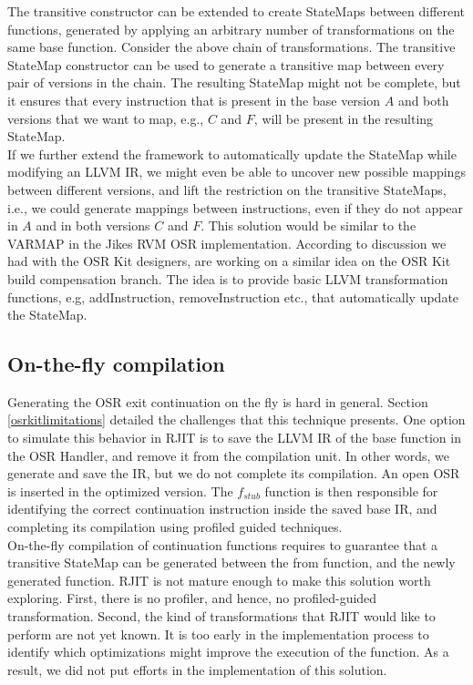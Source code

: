 The transitive constructor can be extended to create StateMaps between different functions, generated by applying an arbitrary number of transformations on the same base function.
Consider the above chain of transformations.
The transitive StateMap constructor can be used to generate a transitive map between every pair of versions in the chain.
The resulting StateMap might not be complete, but it ensures that every instruction that is present in the base version $A$ and both versions that we want to map, e.g., $C$ and $F$, will be present in the resulting StateMap.\\

If we further extend the framework to automatically update the StateMap while modifying an LLVM IR, we might even be able to uncover new possible mappings between different versions, and lift the restriction on the transitive StateMaps, i.e., we could generate mappings between instructions, even if they do not appear in $A$ and in both versions $C$ and $F$.
This solution would be similar to the VARMAP in the Jikes RVM OSR implementation\cite{soman2006efficient}.
According to discussion we had with the OSR Kit designers,  are working on a similar idea on the OSR Kit build compensation branch\cite{OSRKitGit}.
The idea is to provide basic LLVM transformation functions, e.g, addInstruction, removeInstruction etc., that automatically update the StateMap.\\

\subsection{On-the-fly compilation}

Generating the OSR exit continuation on the fly is hard in general. 
Section \ref{osrkitlimitations} detailed the challenges that this technique presents.
One option to simulate this behavior in RJIT is to save the LLVM IR of the base function in the OSR Handler, and remove it from the compilation unit.
In other words, we generate and save the IR, but we do not complete its compilation.
An open OSR is inserted in the optimized version. 
The $f_{stub}$ function is then responsible for identifying the correct continuation instruction inside the saved base IR, and completing its compilation using profiled guided techniques.\\

On-the-fly compilation of continuation functions requires to guarantee that a transitive StateMap can be generated between the from function, and the newly generated function.
RJIT is not mature enough to make this solution worth exploring.
First, there is no profiler, and hence, no profiled-guided transformation. 
Second, the kind of transformations that RJIT would like to perform are not yet known. 
It is too early in the implementation process to identify which optimizations might improve the execution of the function.
As a result, we did not put efforts in the implementation of this solution.\\

